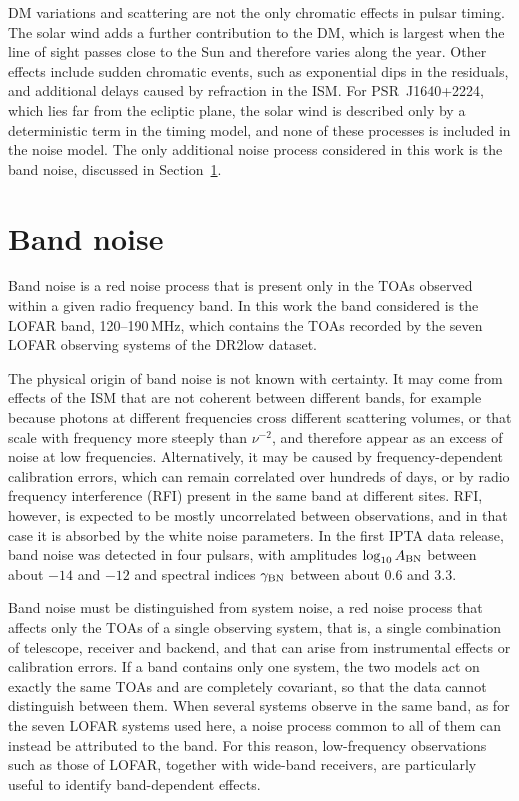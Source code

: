 DM variations and scattering are not the only chromatic effects in pulsar
timing. The solar wind adds a further contribution to the DM, which is largest
when the line of sight passes close to the Sun and therefore varies along the
year. Other effects include sudden chromatic events, such as exponential dips
in the residuals, and additional delays caused by refraction in the ISM. For
PSR~J1640+2224, which lies far from the ecliptic plane, the solar wind is
described only by a deterministic term in the timing model, and none of these
processes is included in the noise model. The only additional noise process
considered in this work is the band noise, discussed in Section~\ref{sec:bn}.


\section{Band noise} \label{sec:bn}

Band noise is a red noise process that is present only in the TOAs observed
within a given radio frequency band. In this work the band considered is the
LOFAR band, 120--190\,MHz, which contains the TOAs recorded by the seven LOFAR
observing systems of the DR2low dataset.

The physical origin of band noise is not known with certainty. It may come from
effects of the ISM that are not coherent between different bands, for example
because photons at different frequencies cross different scattering volumes, or
that scale with frequency more steeply than $\nu^{-2}$, and therefore appear as
an excess of noise at low frequencies. Alternatively, it may be caused by
frequency-dependent calibration errors, which can remain correlated over
hundreds of days, or by radio frequency interference (RFI) present in the same
band at different sites. RFI, however, is expected to be mostly uncorrelated
between observations, and in that case it is absorbed by the white noise
parameters. In the first IPTA data release, band noise was detected in four
pulsars, with amplitudes $\log_{10}A_{\rm BN}$ between about $-14$ and $-12$
and spectral indices $\gamma_{\rm BN}$ between about $0.6$ and $3.3$.

Band noise must be distinguished from system noise, a red noise process that
affects only the TOAs of a single observing system, that is, a single
combination of telescope, receiver and backend, and that can arise from
instrumental effects or calibration errors. If a band contains only one
system, the two models act on exactly the same TOAs and are completely
covariant, so that the data cannot distinguish between them. When several
systems observe in the same band, as for the seven LOFAR systems used here, a
noise process common to all of them can instead be attributed to the band. For
this reason, low-frequency observations such as those of LOFAR, together with
wide-band receivers, are particularly useful to identify band-dependent
effects.

